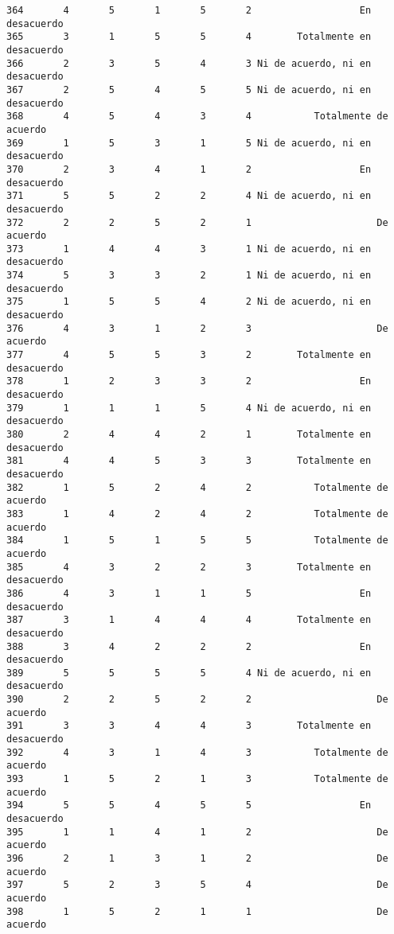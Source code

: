 \documentclass[
  letterpaper,
  DIV=11,
  numbers=noendperiod]{scrartcl}
\begin{document}
\begin{verbatim}
364       4       5       1       5       2                   En desacuerdo
365       3       1       5       5       4        Totalmente en desacuerdo
366       2       3       5       4       3 Ni de acuerdo, ni en desacuerdo
367       2       5       4       5       5 Ni de acuerdo, ni en desacuerdo
368       4       5       4       3       4           Totalmente de acuerdo
369       1       5       3       1       5 Ni de acuerdo, ni en desacuerdo
370       2       3       4       1       2                   En desacuerdo
371       5       5       2       2       4 Ni de acuerdo, ni en desacuerdo
372       2       2       5       2       1                      De acuerdo
373       1       4       4       3       1 Ni de acuerdo, ni en desacuerdo
374       5       3       3       2       1 Ni de acuerdo, ni en desacuerdo
375       1       5       5       4       2 Ni de acuerdo, ni en desacuerdo
376       4       3       1       2       3                      De acuerdo
377       4       5       5       3       2        Totalmente en desacuerdo
378       1       2       3       3       2                   En desacuerdo
379       1       1       1       5       4 Ni de acuerdo, ni en desacuerdo
380       2       4       4       2       1        Totalmente en desacuerdo
381       4       4       5       3       3        Totalmente en desacuerdo
382       1       5       2       4       2           Totalmente de acuerdo
383       1       4       2       4       2           Totalmente de acuerdo
384       1       5       1       5       5           Totalmente de acuerdo
385       4       3       2       2       3        Totalmente en desacuerdo
386       4       3       1       1       5                   En desacuerdo
387       3       1       4       4       4        Totalmente en desacuerdo
388       3       4       2       2       2                   En desacuerdo
389       5       5       5       5       4 Ni de acuerdo, ni en desacuerdo
390       2       2       5       2       2                      De acuerdo
391       3       3       4       4       3        Totalmente en desacuerdo
392       4       3       1       4       3           Totalmente de acuerdo
393       1       5       2       1       3           Totalmente de acuerdo
394       5       5       4       5       5                   En desacuerdo
395       1       1       4       1       2                      De acuerdo
396       2       1       3       1       2                      De acuerdo
397       5       2       3       5       4                      De acuerdo
398       1       5       2       1       1                      De acuerdo

\end{verbatim}
\end{document}
